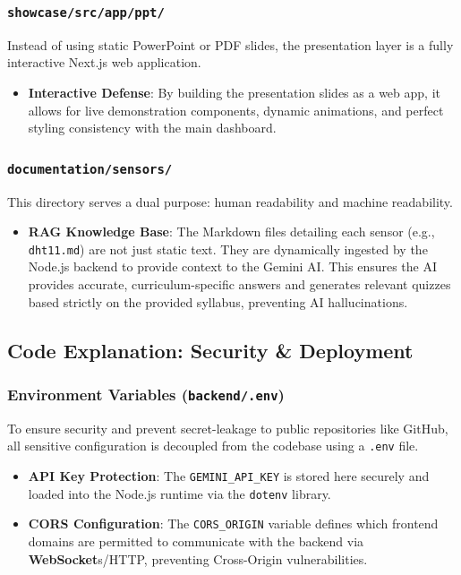 \documentclass[12pt,a4paper]{article}
\newcommand{\keyword}[1]{\textcolor{keywordcolor}{\textbf{#1}}}
\newcommand{\Q}[1]{\textcolor{questioncolor}{\textbf{#1}}}
\newcommand{\codeinline}[1]{\texttt{\small #1}}
\begin{document}
\subsubsection*{\codeinline{showcase/src/app/ppt/}}
Instead of using static PowerPoint or PDF slides, the presentation layer is a fully interactive Next.js web application.
\begin{itemize}
    \item \Q{Interactive Defense}: By building the presentation slides as a web app, it allows for live demonstration components, dynamic animations, and perfect styling consistency with the main dashboard.
\end{itemize}

\subsubsection*{\codeinline{documentation/sensors/}}
This directory serves a dual purpose: human readability and machine readability.
\begin{itemize}
    \item \Q{RAG Knowledge Base}: The Markdown files detailing each sensor (e.g., \texttt{dht11.md}) are not just static text. They are dynamically ingested by the Node.js backend to provide context to the Gemini AI. This ensures the AI provides accurate, curriculum-specific answers and generates relevant quizzes based strictly on the provided syllabus, preventing AI hallucinations.
\end{itemize}

\vspace{0.5cm}

\subsection*{Code Explanation: Security \& Deployment}

\subsubsection*{Environment Variables (\codeinline{backend/.env})}
To ensure security and prevent secret-leakage to public repositories like GitHub, all sensitive configuration is decoupled from the codebase using a \texttt{.env} file.
\begin{itemize}
    \item \Q{API Key Protection}: The \texttt{GEMINI\_API\_KEY} is stored here securely and loaded into the Node.js runtime via the \texttt{dotenv} library.
    \item \Q{CORS Configuration}: The \texttt{CORS\_ORIGIN} variable defines which frontend domains are permitted to communicate with the backend via \keyword{WebSocket}s/HTTP, preventing Cross-Origin vulnerabilities.
\end{itemize}
\end{document}

